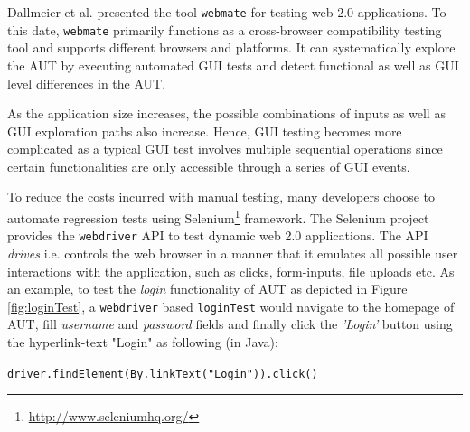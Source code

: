 Dallmeier et al. \cite{webmate} presented the tool \texttt{webmate} for testing web 2.0 applications. To this date, \texttt{webmate} primarily functions as a cross-browser compatibility testing tool and supports different browsers and platforms. It can systematically explore the AUT by executing automated GUI tests and detect functional as well as GUI level differences in the AUT. 

As the application size increases, the possible combinations of inputs as well as GUI exploration paths also increase. Hence, GUI testing becomes more complicated as a typical GUI test involves multiple sequential operations since certain functionalities are only accessible through a series of GUI events.

To reduce the costs incurred with manual testing, many developers choose to automate regression tests using Selenium\footnote{\url{http://www.seleniumhq.org/}} framework. The Selenium project provides the \texttt{webdriver} API to test dynamic web 2.0 applications. The API \textit{drives} i.e. controls the web browser in a manner that it emulates all possible user interactions with the application, such as clicks, form-inputs, file uploads etc. 
As an example, to test the \textit{login} functionality of AUT as depicted in Figure \ref{fig:loginTest}, a \texttt{webdriver} based \texttt{loginTest} would navigate to the homepage of AUT, fill \textit{username} and \textit{password} fields and finally click the \textit{'Login'} button using the hyperlink-text "Login" as following (in Java):
\begin{small}
\texttt{driver.findElement(By.linkText("Login")).click()}
\end{small}



